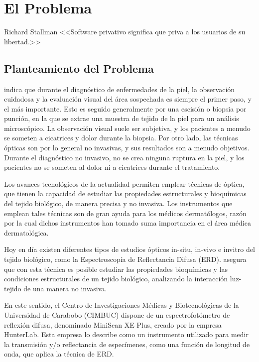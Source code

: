 \chapter{\label{cap:1}El Problema}

\begin{chapquote}{Richard Stallman}
<<Software privativo significa que priva a los usuarios de su libertad.>>
\end{chapquote}

	\section{Planteamiento del Problema}	
\cite{Bersha} indica que durante el diagn\'{o}stico de enfermedades de la piel, la observaci\'{o}n cuidadosa y la evaluaci\'{o}n visual del \'{a}rea sospechada es siempre el primer paso, y el m\'{a}s importante. Esto es seguido generalmente por una escisi\'{o}n o biopsia por punci\'{o}n, en la que se extrae una muestra de tejido de la piel para un an\'{a}lisis microsc\'{o}pico. La observaci\'{o}n visual suele ser subjetiva, y los pacientes a menudo se someten a cicatrices y dolor durante la biopsia. Por otro lado, las t\'{e}cnicas \'{o}pticas son por lo general no invasivas, y sus resultados son a menudo objetivos. Durante el diagn\'{o}stico no invasivo, no se crea ninguna ruptura en la piel, y los pacientes no se someten al dolor ni a cicatrices durante el tratamiento.

Los avances tecnol\'{o}gicos de la actualidad permiten emplear t\'{e}cnicas de \'{o}ptica, que tienen la capacidad de estudiar  las propiedades estructurales y bioqu\'{i}micas del tejido biol\'{o}gico, de manera precisa y no invasiva. Los instrumentos que emplean tales t\'{e}cnicas son de gran ayuda para los m\'{e}dicos dermat\'{o}logos, raz\'{o}n por la cual dichos instrumentos han tomado suma importancia en el \'{a}rea m\'{e}dica dermatol\'{o}gica.

Hoy en d\'{i}a existen diferentes tipos de estudios \'{o}pticos in-situ, in-vivo e invitro del tejido biol\'{o}gico, como la Espectroscop\'{i}a de Reflectancia Difusa (ERD). \cite{Perez} asegura que con esta t\'{e}cnica es  posible estudiar las propiedades bioqu\'{i}micas y las condiciones estructurales de un tejido biol\'{o}gico, analizando la interacci\'{o}n luz-tejido de una manera no invasiva.

En este sentido, el Centro de Investigaciones M\'{e}dicas y Biotecnol\'{o}gicas de la Universidad de Carabobo (CIMBUC) dispone de un espectrofot\'{o}metro de reflexi\'{o}n difusa, denominado MiniScan XE Plus, creado por la empresa HunterLab. Esta empresa lo describe como un instrumento utilizado para medir la transmisi\'{o}n y/o reflectancia de espec\'{i}menes, como una funci\'{o}n de longitud de onda, que aplica la t\'{e}cnica de ERD. 

